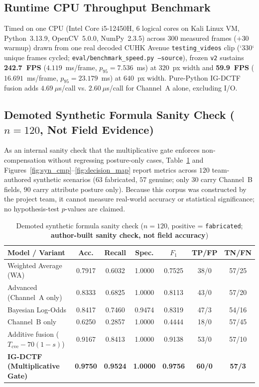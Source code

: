 \subsection{Runtime CPU Throughput Benchmark}
Timed on one CPU (Intel Core i5-12450H, 6 logical cores on Kali Linux VM, Python~3.13.9, OpenCV~5.0.0, NumPy~2.3.5) across $300$ measured frames ($+30$ warmup) drawn from one real decoded CUHK Avenue \texttt{testing\_videos} clip (`330` unique frames cycled; \texttt{eval/benchmark\_speed.py --source}), frozen \texttt{v2} sustains \textbf{242.7~FPS} ($4.119$~ms/frame, $p_{95} = 7.536$~ms) at $320$~px width and \textbf{59.9~FPS} ($16.691$~ms/frame, $p_{95} = 23.179$~ms) at $640$~px width. Pure-Python IG-DCTF fusion adds $4.69~\mu$s/call vs. $2.60~\mu$s/call for Channel~A alone, excluding I/O.

\subsection{Demoted Synthetic Formula Sanity Check (\texorpdfstring{$n = 120$}{n = 120}, Not Field Evidence)}
As an internal sanity check that the multiplicative gate enforces non-compensation without regressing posture-only cases, Table~\ref{tab:syn_models} and Figures~\ref{fig:syn_cmp}--\ref{fig:decision_map} report metrics across $120$ team-authored synthetic scenarios ($63$ fabricated, $57$ genuine; only $30$ carry Channel~B fields, $90$ carry attribute posture only). Because this corpus was constructed by the project team, it cannot measure real-world accuracy or statistical significance; no hypothesis-test $p$-values are claimed.

\begin{table}[!ht]
  \centering
  \caption{Demoted synthetic formula sanity check ($n = 120$, positive = \texttt{fabricated}; \textbf{author-built sanity check, not field accuracy})}
  \label{tab:syn_models}
  \begin{tabular}{@{}lcccccc@{}}
    \toprule
    \textbf{Model / Variant} & \textbf{Acc.} & \textbf{Recall} & \textbf{Spec.} & \textbf{$F_1$} & \textbf{TP/FP} & \textbf{TN/FN} \\
    \midrule
    Weighted Average (WA) & 0.7917 & 0.6032 & 1.0000 & 0.7525 & 38/0 & 57/25 \\
    Advanced (Channel~A only) & 0.8333 & 0.6825 & 1.0000 & 0.8113 & 43/0 & 57/20 \\
    Bayesian Log-Odds & 0.8417 & 0.7460 & 0.9474 & 0.8319 & 47/3 & 54/16 \\
    Channel~B only & 0.6250 & 0.2857 & 1.0000 & 0.4444 & 18/0 & 57/45 \\
    Additive fusion ($T_{\mathrm{cve}} - 70(1-s)$) & 0.9167 & 0.8413 & 1.0000 & 0.9138 & 53/0 & 57/10 \\
    \textbf{IG-DCTF (Multiplicative Gate)} & \textbf{0.9750} & \textbf{0.9524} & \textbf{1.0000} & \textbf{0.9756} & \textbf{60/0} & \textbf{57/3} \\
    \bottomrule
  \end{tabular}
\end{table}

